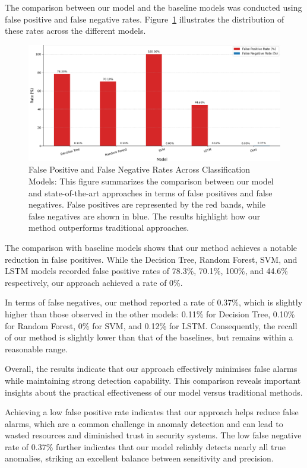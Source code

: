\documentclass[preprint,12pt,authoryear]{elsarticle}
\begin{document}
\noindent The comparison between our model and the baseline models was conducted using false positive and false negative rates. Figure~\ref{fig:fp_fn_comparison} illustrates the distribution of these rates across the different models.
\begin{figure}[H]
    \centering
    \includegraphics[width=1.05\linewidth]{compa3.png}
    \caption{False Positive and False Negative Rates Across Classification Models:
This figure summarizes the comparison between our model and state-of-the-art approaches in terms of false positives and false negatives. False positives are represented by the red bands, while false negatives are shown in blue. The results highlight how our method outperforms traditional approaches.}
    \label{fig:fp_fn_comparison}
\end{figure}
\noindent The comparison with baseline models shows that our method achieves a notable reduction in false positives. While the Decision Tree, Random Forest, SVM, and LSTM models recorded false positive rates of 78.3\%, 70.1\%, 100\%, and 44.6\% respectively, our approach achieved a rate of 0\%. 

In terms of false negatives, our method reported a rate of 0.37\%, which is slightly higher than those observed in the other models: 0.11\% for Decision Tree, 0.10\% for Random Forest, 0\% for SVM, and 0.12\% for LSTM. Consequently, the recall of our method is slightly lower than that of the baselines, but remains within a reasonable range.


Overall, the results indicate that our approach effectively minimises false alarms while maintaining strong detection capability. This comparison  reveals important insights about the practical effectiveness of our model versus traditional methods. 

Achieving a low false positive rate indicates that our approach helps reduce false alarms, which are a common challenge in anomaly detection and can lead to wasted resources and diminished trust in security systems. The low false negative rate of 0.37\% further indicates that our model reliably detects nearly all true anomalies, striking an excellent balance between sensitivity and precision.
\end{document}
